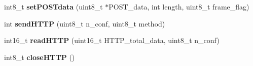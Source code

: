\begin{DoxyCompactItemize}
\item 
int8\+\_\+t {\bfseries set\+P\+O\+S\+Tdata} (uint8\+\_\+t $\ast$P\+O\+S\+T\+\_\+data, int length, uint8\+\_\+t frame\+\_\+flag)\hypertarget{class_wasp_g_p_r_s___pro__core_a81e573d42a9cc8ca1d48c98a6024c9bb}{}\label{class_wasp_g_p_r_s___pro__core_a81e573d42a9cc8ca1d48c98a6024c9bb}

\item 
int {\bfseries send\+H\+T\+TP} (uint8\+\_\+t n\+\_\+conf, uint8\+\_\+t method)\hypertarget{class_wasp_g_p_r_s___pro__core_a93a5121298d7e53e98cf24d14e24f142}{}\label{class_wasp_g_p_r_s___pro__core_a93a5121298d7e53e98cf24d14e24f142}

\item 
int16\+\_\+t {\bfseries read\+H\+T\+TP} (uint16\+\_\+t H\+T\+T\+P\+\_\+total\+\_\+data, uint8\+\_\+t n\+\_\+conf)\hypertarget{class_wasp_g_p_r_s___pro__core_aa6d2481bd1120b19af335c942d34dfe7}{}\label{class_wasp_g_p_r_s___pro__core_aa6d2481bd1120b19af335c942d34dfe7}

\item 
int8\+\_\+t {\bfseries close\+H\+T\+TP} ()\hypertarget{class_wasp_g_p_r_s___pro__core_a35638aa68fbf42d4393152afd3dce1e8}{}\label{class_wasp_g_p_r_s___pro__core_a35638aa68fbf42d4393152afd3dce1e8}

\end{DoxyCompactItemize}
